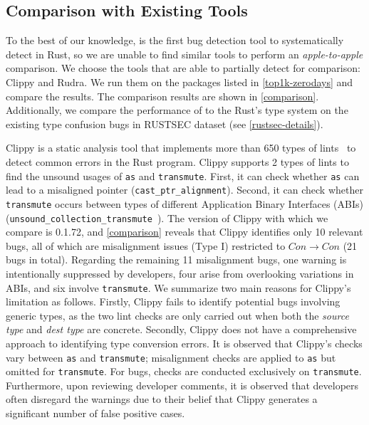 \subsection{Comparison with Existing Tools} \label{evaluation:comparison}
To the best of our knowledge, \TN is the first bug detection tool to systematically detect \bugs in Rust, 
so we are unable to find similar tools to perform an {\it apple-to-apple} comparison. We choose the tools that are able to partially detect \bugs for comparison: Clippy\cite{clippy} and Rudra\cite{Yechan2021Rudra}. We run them on the packages listed in \autoref{top1k-zerodays} and compare the results. The comparison results are shown in \autoref{comparison}. Additionally, we compare the performance of \TN to the Rust's type system on the existing type confusion bugs in RUSTSEC dataset (see \autoref{rustsec-details}).













\vspace{0.05in}
Clippy is a static analysis tool that implements more than 650 types of lints~\cite{Lintsoft25online} to detect common errors in the Rust program. 
Clippy supports 2 types of lints to find the unsound usages of \texttt{as} and \texttt{transmute}. 
First, it can check whether \texttt{as} can lead to a misaligned pointer (\texttt{cast\_ptr\_alignment}\cite{castptralignment}). 
Second, it can check whether \texttt{transmute} occurs between types of different Application Binary Interfaces (ABIs) (\texttt{unsound\_collection\_transmute}~\cite{unsoundcollectiontransmute}). 
The version of Clippy with which we compare is 0.1.72, and \autoref{comparison} reveals that Clippy identifies only {10} relevant bugs, all of which are misalignment issues (Type I) restricted to $Con \rightarrow Con$ ({21} bugs in total).
{Regarding the remaining 11 misalignment bugs, one warning is intentionally suppressed by developers, four arise from overlooking variations in ABIs, and six involve \texttt{transmute}.}
We summarize two main reasons for Clippy's limitation as follows.
Firstly, Clippy fails to identify potential bugs involving generic types, as the two lint checks are only carried out when both the \textit{source type} and \textit{dest type} are concrete. Secondly, Clippy does not have a comprehensive approach to identifying type conversion errors. It is observed that Clippy's checks vary between \texttt{as} and \texttt{transmute}; misalignment checks are applied to \texttt{as} but omitted for \texttt{transmute}. For \btwo bugs, checks are conducted exclusively on \texttt{transmute}.
Furthermore, upon reviewing developer comments, it is observed that developers often disregard the warnings due to their belief that Clippy generates a significant number of false positive cases.






